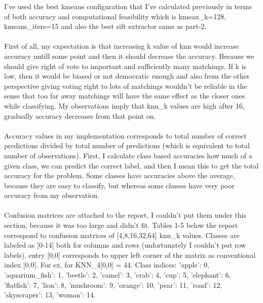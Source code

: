 \documentclass[12pt]{article}
\begin{document}
        \begin{center}
            \raggedright
            I've used the best kmeans configuration that I've calculated previously in terms of both accuracy and computational feasibility which
            is kmean\_k=128, kmeans\_iters=15 and also the best sift extractor same as part-2.
            \\~\\
            First of all, my expectation is that increasing k value of knn would increase accuracy untill some point and then it should decrease the accuracy.
            Because we should give right of vote to important and sufficiently many matchings.
            If k is low, then it would be biased or not democratic enough and also from the other perspective giving voting right to lots of matchings wouldn't be reliable in the sense that
            too far away matchings will have the same effect as the closer ones while classifying.
            My observations imply that knn\_k values are high after 16, gradually accuracy decreases from that point on.
            \\~\\
            Accuracy values in my implementation corresponds to total number of correct predictions divided by total number of predictions (which is equivalent to total number of observations).
            First, I calculate class based accuracies how much of a given class, we can predict the correct label, and then
            I mean this to get the total accuracy for the problem. Some classes have accuracies above the average, because they are easy to classify, but
            whereas some classes have very poor accuracy from my observation.
            \\~\\
            Confusion matrices are attached to the report, I couldn't put them under this section, because it was too large and didn't fit.
            Tables 1-5 below the report correspond to confusion matrices of [4,8,16,32,64] knn\_k values.
            Classes are labeled as [0-14] both for columns and rows (unfortunately I couldn't put row labels), entry [0,0] corresponds to upper left corner of the matrix as conventional index [0,0]. 
            For ex, for KNN\_4[0,0] = 44. Class indices: {'apple': 0, 'aquarium\_fish': 1, 'beetle': 2, 'camel': 3, 'crab': 4, 'cup': 5, 'elephant': 6, 'flatfish': 7, 'lion': 8, 'mushroom': 9, 'orange': 10, 'pear': 11, 'road': 12, 'skyscraper': 13, 'woman': 14}.


        \end{center}
\end{document}
